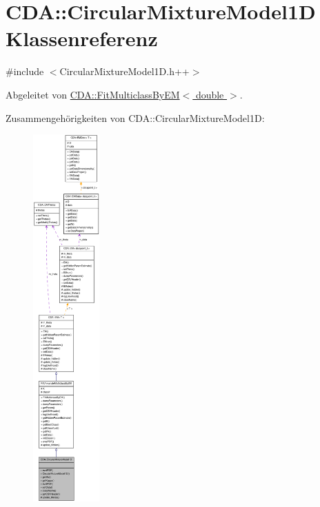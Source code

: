 \hypertarget{classCDA_1_1CircularMixtureModel1D}{
\section{CDA::CircularMixtureModel1D Klassenreferenz}
\label{classCDA_1_1CircularMixtureModel1D}
}


{\ttfamily \#include $<$CircularMixtureModel1D.h++$>$}



Abgeleitet von \hyperlink{classCDA_1_1FitMulticlassByEM}{CDA::FitMulticlassByEM$<$ double $>$}.



Zusammengehörigkeiten von CDA::CircularMixtureModel1D:\nopagebreak
\begin{figure}[H]
\begin{center}
\leavevmode
\includegraphics[height=400pt]{classCDA_1_1CircularMixtureModel1D__coll__graph}
\end{center}
\end{figure}
